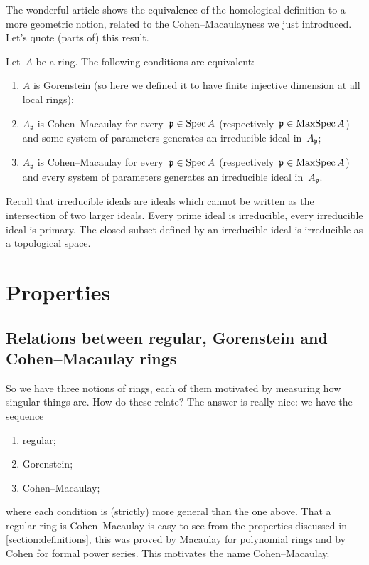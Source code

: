 \documentclass[10pt,a4paper]{article}
\begin{document}
The wonderful article \cite{bass-ubiquity-gorenstein-rings} shows the equivalence of the homological definition to a more geometric notion, related to the Cohen--Macaulayness we just introduced. Let's quote (parts of) this result.
\begin{theorem}
  \label{lemma:gorenstein-CM-relation}
  Let~$A$ be a ring. The following conditions are equivalent:
  \begin{enumerate}
    \item $A$ is Gorenstein (so here we defined it to have finite injective dimension at all local rings);
    \item $A_{\mathfrak{p}}$ is Cohen--Macaulay for every~$\mathfrak{p}\in\operatorname{Spec} A$ (respectively~$\mathfrak{p}\in\operatorname{MaxSpec} A$) and some system of parameters generates an irreducible ideal in~$A_{\mathfrak{p}}$;
    \item $A_{\mathfrak{p}}$ is Cohen--Macaulay for every~$\mathfrak{p}\in\operatorname{Spec} A$ (respectively~$\mathfrak{p}\in\operatorname{MaxSpec} A$) and every system of parameters generates an irreducible ideal in~$A_{\mathfrak{p}}$.
  \end{enumerate}
\end{theorem}
Recall that irreducible ideals are ideals which cannot be written as the intersection of two larger ideals. Every prime ideal is irreducible, every irreducible ideal is primary. The closed subset defined by an irreducible ideal is irreducible as a topological space.



\section{Properties}
\label{section:properties}
\subsection{Relations between regular, Gorenstein and Cohen--Macaulay rings}
\label{subsection:relations}
So we have three notions of rings, each of them motivated by measuring how singular things are. How do these relate? The answer is really nice: we have the sequence
\begin{enumerate}
  \item regular;
  \item Gorenstein;
  \item Cohen--Macaulay;
\end{enumerate}
where each condition is (strictly) more general than the one above. That a regular ring is Cohen--Macaulay is easy to see from the properties discussed in \cref{section:definitions}, this was proved by Macaulay for polynomial rings and by Cohen for formal power series. This motivates the name Cohen--Macaulay.
\end{document}
